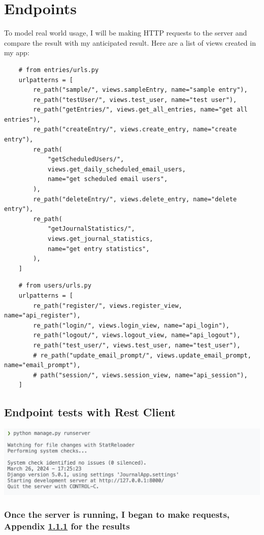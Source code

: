 \section{Endpoints}
To model real world usage, I will be making HTTP requests to the server and compare the result with my anticipated result. Here are a list of views created in my app:

\begin{verbatim}
    # from entries/urls.py
    urlpatterns = [
        re_path("sample/", views.sampleEntry, name="sample entry"),
        re_path("testUser/", views.test_user, name="test user"),
        re_path("getEntries/", views.get_all_entries, name="get all entries"),
        re_path("createEntry/", views.create_entry, name="create entry"),
        re_path(
            "getScheduledUsers/",
            views.get_daily_scheduled_email_users,
            name="get scheduled email users",
        ),
        re_path("deleteEntry/", views.delete_entry, name="delete entry"),
        re_path(
            "getJournalStatistics/",
            views.get_journal_statistics,
            name="get entry statistics",
        ),
    ]
\end{verbatim}


\begin{verbatim}
    # from users/urls.py
    urlpatterns = [
        re_path("register/", views.register_view, name="api_register"),
        re_path("login/", views.login_view, name="api_login"),
        re_path("logout/", views.logout_view, name="api_logout"),
        re_path("test_user/", views.test_user, name="test_user"),
        # re_path("update_email_prompt/", views.update_email_prompt, name="email_prompt"),
        # path("session/", views.session_view, name="api_session"),
    ]
\end{verbatim}
\subsection{Endpoint tests with Rest Client}
\includegraphics[width=\textwidth]{Assets/django_running.png}

\subsubsection{Once the server is running, I began to make requests, Appendix \ref{} for the results}
